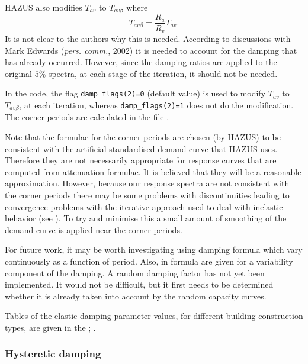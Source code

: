 HAZUS also modifies $T_{av}$ to $T_{av\beta}$ where
$$
 T_{av\beta} = \frac{R_a}{R_v}T_{av}.
$$
It is not clear to the authors why this is needed. According to
discussions with Mark Edwards (\textit{pers. comm.}, 2002) it is
needed to account for the damping that has already occurred.
However, since the damping ratios are applied to the original
$5\%$ spectra, at each stage of the iteration, it should not be
needed.

In the code, the flag \verb|damp_flags(2)=0|
(default value) is used to modify $T_{av}$ to $T_{av\beta}$, at
each iteration, whereas \verb|damp_flags(2)=1| does not do the
modification. The corner periods are calculated in the file
.


Note that the formulae for the corner periods are chosen (by
HAZUS) to be consistent with the artificial standardised demand
curve that HAZUS uses. Therefore they are not
necessarily appropriate for response curves that are computed from
attenuation formulae. It is believed that they will be a
reasonable approximation. However, because our response spectra
are not consistent with the corner periods there may be some
problems with discontinuities leading to convergence problems with
the iterative approach used to deal with inelastic behavior (see
). To try and minimise this a small
amount of smoothing of the demand curve is
applied near the corner periods.

For future work, it may be worth investigating using damping
formula which vary continuously as a function of period. Also, in
\cite{Newmark82} formula are given for a variability component of
the damping. A random damping factor has not yet been implemented.
It would not be difficult, but it first needs to be determined
whether it is already taken into account by the random capacity
curves.

Tables of the elastic damping parameter values, for different
building construction types, are given in the
; .


\subsubsection{Hysteretic damping}
\label{sec:dam-hystericdamping}

